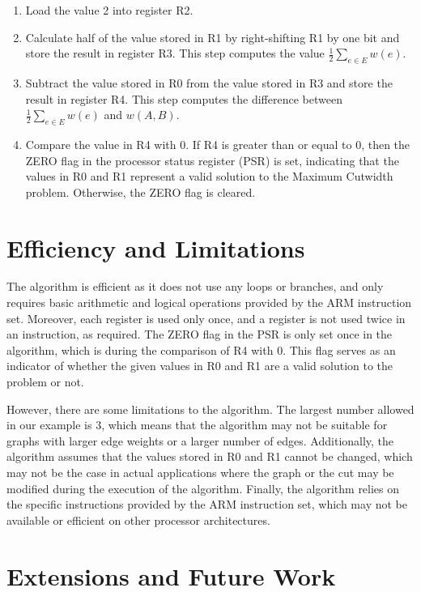 \begin{enumerate}
    \item Load the value 2 into register R2.
    \item Calculate half of the value stored in R1 by right-shifting R1 by one bit and store the result in register R3. This step computes the value $\frac{1}{2} \sum_{e \in E} w(e)$.
    \item Subtract the value stored in R0 from the value stored in R3 and store the result in register R4. This step computes the difference between $\frac{1}{2} \sum_{e \in E} w(e)$ and $w(A, B)$.
    \item Compare the value in R4 with 0. If R4 is greater than or equal to 0, then the ZERO flag in the processor status register (PSR) is set, indicating that the values in R0 and R1 represent a valid solution to the Maximum Cutwidth problem. Otherwise, the ZERO flag is cleared.
\end{enumerate}

\section{Efficiency and Limitations}

The algorithm is efficient as it does not use any loops or branches, and only requires basic arithmetic and logical operations provided by the ARM instruction set. Moreover, each register is used only once, and a register is not used twice in an instruction, as required. The ZERO flag in the PSR is only set once in the algorithm, which is during the comparison of R4 with 0. This flag serves as an indicator of whether the given values in R0 and R1 are a valid solution to the problem or not.

However, there are some limitations to the algorithm. The largest number allowed in our example is 3, which means that the algorithm may not be suitable for graphs with larger edge weights or a larger number of edges. Additionally, the algorithm assumes that the values stored in R0 and R1 cannot be changed, which may not be the case in actual applications where the graph or the cut may be modified during the execution of the algorithm. Finally, the algorithm relies on the specific instructions provided by the ARM instruction set, which may not be available or efficient on other processor architectures.

\section{Extensions and Future Work}

